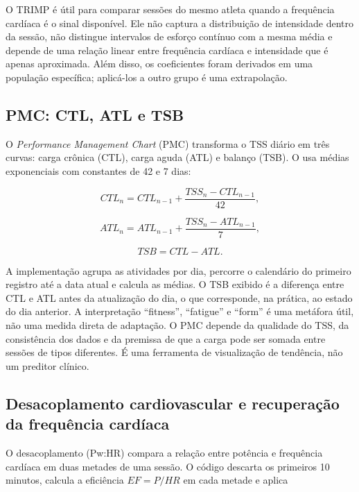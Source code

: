 O TRIMP é útil para comparar sessões do mesmo atleta quando a frequência
cardíaca é o sinal disponível. Ele não captura a distribuição de intensidade
dentro da sessão, não distingue intervalos de esforço contínuo com a mesma
média e depende de uma relação linear entre frequência cardíaca e intensidade
que é apenas aproximada. Além disso, os coeficientes foram derivados em uma
população específica; aplicá-los a outro grupo é uma extrapolação.

\subsection{PMC: CTL, ATL e TSB}
\label{sec:pmc}

O \textit{Performance Management Chart} (PMC) transforma o TSS diário em três
curvas: carga crônica (CTL), carga aguda (ATL) e balanço (TSB). O \argus{} usa
médias exponenciais com constantes de 42 e 7 dias:

\begin{equation}\label{eq:ctl}
CTL_n = CTL_{n-1} + \frac{TSS_n - CTL_{n-1}}{42},
\end{equation}

\begin{equation}\label{eq:atl}
ATL_n = ATL_{n-1} + \frac{TSS_n - ATL_{n-1}}{7},
\end{equation}

\begin{equation}\label{eq:tsb}
TSB = CTL - ATL.
\end{equation}

A implementação agrupa as atividades por dia, percorre o calendário do primeiro
registro até a data atual e calcula as médias. O TSB exibido é a diferença entre
CTL e ATL antes da atualização do dia, o que corresponde, na prática, ao estado
do dia anterior. A interpretação ``fitness'', ``fatigue'' e ``form'' é uma
metáfora útil, não uma medida direta de adaptação. O PMC depende da qualidade
do TSS, da consistência dos dados e da premissa de que a carga pode ser somada
entre sessões de tipos diferentes. É uma ferramenta de visualização de
tendência, não um preditor clínico.

\subsection{Desacoplamento cardiovascular e recuperação da frequência cardíaca}
\label{sec:decoupling-hrr}

O desacoplamento (Pw:HR) compara a relação entre potência e frequência cardíaca
em duas metades de uma sessão. O código descarta os primeiros 10 minutos,
calcula a eficiência $EF = P/HR$ em cada metade e aplica

